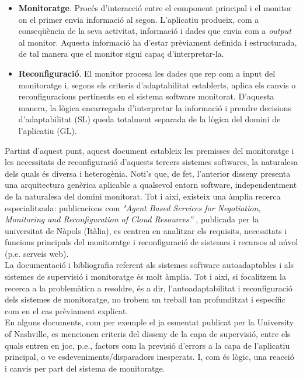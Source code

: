 \begin{itemize}
\item \textbf{Monitoratge}. Procés d'interacció entre el component principal i el monitor on el primer envia informació al segon. L'aplicatiu produeix, com a conseqüència de la seva activitat, informació i dades que envia com a \textit{output} al monitor. Aquesta informació ha d'estar prèviament definida i estructurada, de tal manera que el monitor sigui capaç d'interpretar-la.
\item \textbf{Reconfiguració}. El monitor procesa les dades que rep com a input del monitoratge i, segons els criteris d'adaptabilitat establerts, aplica els canvis o reconfiguracions pertinents en el sistema software monitorat. D'aquesta manera, la lògica encarregada d'interpretar la informació i prendre decisions d'adaptabilitat (SL) queda totalment separada de la lògica del domini de l'aplicatiu (GL).
\end{itemize}

Partint d'aquest punt, aquest document estableix les premisses del monitoratge i les necessitats de reconfiguració d’aquests tercers sistemes softwares, la naturalesa dels quals és diversa i heterogènia. Noti's que, de fet, l'anterior disseny presenta una arquitectura genèrica aplicable a qualsevol entorn software, independentment de la naturalesa del domini monitorat. Tot i així, existeix una àmplia recerca especialitzada: publicacions com \textit{"Agent Based Services for Negotiation, Monitoring and Reconfiguration of Cloud Resources”} , publicada per la universitat de Nàpols (Itàlia), es centren en analitzar els requisits, necessitats i funcions principals del monitoratge i reconfiguració de sistemes i recursos al núvol (p.e. serveis web).\\

La documentació i bibliografia referent als sistemes software autoadaptables i als sistemes de supervisió i monitoratge és molt àmplia. Tot i així, si focalitzem la recerca a la problemàtica a resoldre, és a dir, l’autoadaptabilitat i reconfiguració dels sistemes de monitoratge, no trobem un treball tan profunditzat i específic com en el cas prèviament explicat.\\

En alguns documents, com per exemple el ja esmentat publicat per la University of Nashville, es mencionen criteris del disseny de la capa de supervisió, entre els quals entren en joc, p.e., factors com la previsió d’errors a la capa de l’aplicatiu principal, o ve esdeveniments/disparadors inesperats. I, com és lògic, una reacció i canvis per part del sistema de monitoratge. \\

